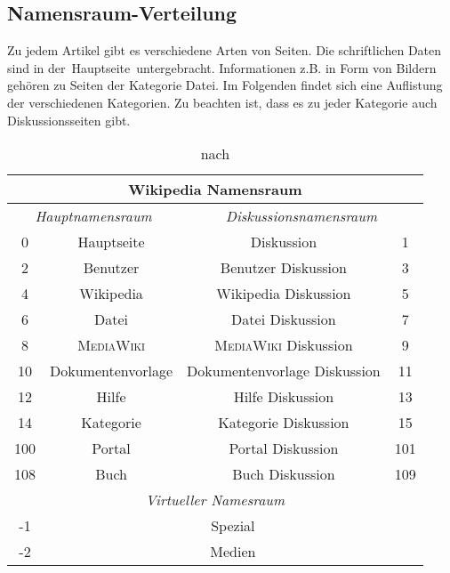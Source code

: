 \documentclass[fontsize=11pt, twoside, a4paper]{scrartcl}
\begin{document}
\subsection{Namensraum-Verteilung}
Zu jedem Artikel gibt es verschiedene Arten von Seiten. Die schriftlichen Daten sind in der \,\glqq Hauptseite\grqq\, untergebracht. Informationen z.B. in Form von Bildern gehören zu Seiten der Kategorie \glqq Datei\grqq . Im Folgenden findet sich eine Auflistung der verschiedenen Kategorien. Zu beachten ist, dass es zu jeder Kategorie auch Diskussionsseiten gibt.
\begin{table}[H]
\centering
\caption{nach \cite{namespace}}
\begin{tabular}{|c|c|c|c|}
\hline
\multicolumn{4}{|c|}{\textbf{Wikipedia Namensraum}}\\
\hline
\multicolumn{2}{|c|}{\textit{Hauptnamensraum}} & \multicolumn{2}{|c|}{\textit{Diskussionsnamensraum}}\\
\hline
0 & Hauptseite & Diskussion & 1 \\
2 & Benutzer & Benutzer Diskussion & 3 \\
4 & Wikipedia & Wikipedia Diskussion & 5 \\
6 & Datei & Datei Diskussion & 7 \\
8 & \textsc{MediaWiki} & \textsc{MediaWiki} Diskussion & 9 \\
10 & Dokumentenvorlage & Dokumentenvorlage Diskussion & 11 \\
12 & Hilfe & Hilfe Diskussion & 13 \\
14 & Kategorie & Kategorie Diskussion & 15 \\
100 & Portal & Portal Diskussion & 101 \\
108 & Buch & Buch Diskussion & 109 \\
\hline
\multicolumn{4}{|c|}{\textit{Virtueller Namesraum}}\\
\hline
-1 & \multicolumn{3}{|c|}{Spezial}\\
-2 & \multicolumn{3}{|c|}{Medien}\\
\hline
\end{tabular}
\end{table}
\end{document}
